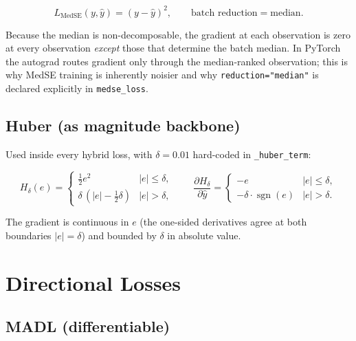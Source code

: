 \begin{equation}
L_{\mathrm{MedSE}}(y, \hat y) = (y - \hat y)^2,
\qquad
\text{batch reduction} = \mathrm{median}.
\end{equation}

Because the median is non-decomposable, the gradient at each observation is zero at every observation \emph{except} those that determine the batch median. In PyTorch the autograd routes gradient only through the median-ranked observation; this is why MedSE training is inherently noisier and why \texttt{reduction="median"} is declared explicitly in \texttt{medse\_loss}.

\subsection{Huber (as magnitude backbone)}

\label{subsec:huber}

Used inside every hybrid loss, with $\delta = 0.01$ hard-coded in \texttt{\_huber\_term}:

\begin{equation}
H_\delta(e) =
\begin{cases}
\tfrac12 e^2 & |e| \le \delta, \\
\delta\, (|e| - \tfrac12 \delta) & |e| > \delta,
\end{cases}
\qquad
\frac{\partial H_\delta}{\partial \hat y}
=
\begin{cases}
-e & |e| \le \delta, \\
-\delta \cdot \operatorname{sgn}(e) & |e| > \delta.
\end{cases}
\end{equation}

The gradient is continuous in $e$ (the one-sided derivatives agree at both boundaries $|e| = \delta$) and bounded by $\delta$ in absolute value.

\section{Directional Losses}

\label{sec:directional-losses}

\subsection{MADL (differentiable)}

\label{subsec:madl}

